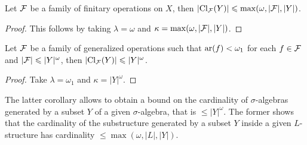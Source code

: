 \documentclass[twoside,openright,titlepage,numbers=noenddot,%
               headinclude,footinclude,cleardoublepage=empty,abstract=on,
               BCOR=23mm,paper=letter,fontsize=11pt
               ]{scrreprt}
\begin{document}
\begin{corollary}
    Let $\mathcal{F}$ be a family of finitary operations on $X$, then $\vert \mathrm{Cl}_{\mathcal{F}}(Y) \vert \leqslant \max(\omega, \vert \mathcal{F} \vert, \vert Y \vert)$.
\end{corollary}
\begin{proof}
    This follows by taking $\lambda = \omega$ and $\kappa = \max(\omega, \vert \mathcal{F} \vert, \vert Y \vert)$.
\end{proof}
\begin{corollary}
    Let $\mathcal{F}$ be a family of generalized operations such that $\mathrm{ar}(f) < \omega_1$ for each $f \in \mathcal{F}$ and $\vert \mathcal{F} \vert \leqslant \vert Y \vert^\omega$, then $\vert \mathrm{Cl}_{\mathcal{F}}(Y) \vert \leqslant \vert Y \vert^\omega$.
\end{corollary}
\begin{proof}
    Take $\lambda = \omega_1$ and $\kappa = \vert Y \vert^\omega$.
\end{proof}
\begin{example}
    The latter corollary allows to obtain a bound on the cardinality of $\sigma$-algebras generated by a subset $Y$ of a given $\sigma$-algebra, that is $\leq \vert Y \vert^\omega$. The former shows that the cardinality of the substructure generated by a subset $Y$ inside a given $L$-structure has cardinality $\leq \max(\omega, \vert L \vert, \vert Y \vert)$.
\end{example}
\end{document}
